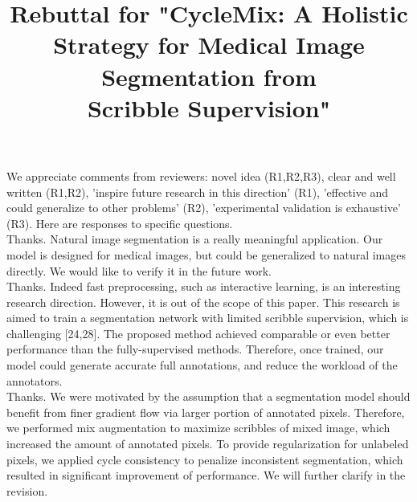 \documentclass[10pt,twocolumn,letterpaper]{article}
\begin{document}
\title{Rebuttal for "CycleMix: A Holistic Strategy for Medical Image Segmentation from\\Scribble Supervision"}  

\maketitle
\thispagestyle{empty}
\appendix

We appreciate comments from reviewers: novel idea (R1,R2,R3), clear and well written (R1,R2), 'inspire future research in this direction' (R1), 'effective and could generalize to other problems' (R2), 'experimental validation is exhaustive' (R3). Here are responses to specific questions.
\hfill
\\

 Thanks. Natural image segmentation is a really meaningful application. Our model is designed for medical images, but could be generalized to natural images directly. We would like to verify it in the future work.
\hfill
\\

Thanks. Indeed fast preprocessing, such as interactive learning, is an interesting research direction. However, it is out of the scope of this paper. This research is aimed to train a segmentation network with limited scribble supervision, which is challenging [24,28]. The proposed method achieved comparable or even better performance than the fully-supervised methods.  Therefore, once trained, our model could generate accurate full annotations, and reduce the workload of the annotators.
\hfill
\\

\newline{}
Thanks. 
We were motivated by the assumption that a segmentation model should benefit from finer gradient flow via larger portion of annotated pixels.
Therefore, we performed mix augmentation to maximize scribbles of mixed image, which increased the amount of annotated pixels.
To provide regularization for unlabeled pixels, we applied cycle consistency to penalize inconsistent segmentation, which resulted in significant improvement of performance. 
We will further clarify in the revision.
\hfill
\\
\end{document}
